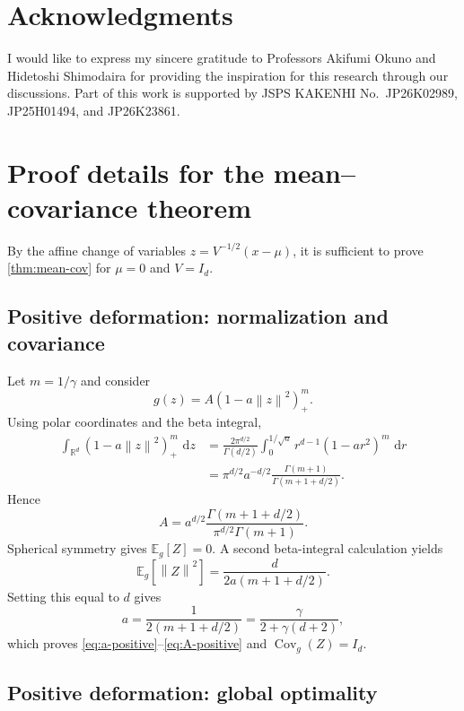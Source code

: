 \documentclass[pdflatex,sn-mathphys-num]{sn-jnl}
\theoremstyle{thmstyleone}
\theoremstyle{thmstyletwo}
\theoremstyle{thmstylethree}
\DeclareMathOperator{\Cov}{Cov}
\newcommand{\dd}{\,\mathrm{d}}
\newcommand{\R}{\mathbb{R}}
\newcommand{\E}{\mathbb{E}}
\newcommand{\norm}[1]{\left\lVert #1\right\rVert}
\begin{document}
\section*{Acknowledgments}
I would like to express my sincere gratitude to Professors Akifumi Okuno and Hidetoshi Shimodaira for providing the inspiration for this research through our discussions.
Part of this work is supported by JSPS KAKENHI No.~JP26K02989, JP25H01494, and JP26K23861.


\newpage
\appendix

\section{Proof details for the mean--covariance theorem}\label{app:mean-cov-proof}

By the affine change of variables $z=V^{-1/2}(x-\mu)$, it is sufficient to prove \cref{thm:mean-cov} for $\mu=0$ and $V=I_d$.

\subsection{Positive deformation: normalization and covariance}\label{app:positive-integrals}

Let $m=1/\gamma$ and consider
\[
 g(z)=A(1-a\norm{z}^2)_+^m.
\]
Using polar coordinates and the beta integral,
\begin{align}
 \int_{\R^d}(1-a\norm{z}^2)_+^m\,\dd z
 &=
 \frac{2\pi^{d/2}}{\Gamma(d/2)}
 \int_0^{1/\sqrt a}r^{d-1}(1-ar^2)^m\,\dd r \\
 &=
 \pi^{d/2}a^{-d/2}
 \frac{\Gamma(m+1)}{\Gamma(m+1+d/2)}.
\label{eq:positive-beta-normalization}
\end{align}
Hence
\[
 A=a^{d/2}
 \frac{\Gamma(m+1+d/2)}{\pi^{d/2}\Gamma(m+1)}.
\]
Spherical symmetry gives $\E_g[Z]=0$. A second beta-integral calculation yields
\begin{equation}
 \E_g[\norm{Z}^2]
 =
 \frac{d}{2a(m+1+d/2)}.
\label{eq:positive-second-moment}
\end{equation}
Setting this equal to $d$ gives
\[
 a=\frac{1}{2(m+1+d/2)}
 =\frac{\gamma}{2+\gamma(d+2)},
\]
which proves \cref{eq:a-positive}--\cref{eq:A-positive} and $\Cov_g(Z)=I_d$.

\subsection{Positive deformation: global optimality}\label{app:positive-optimality}
\end{document}
